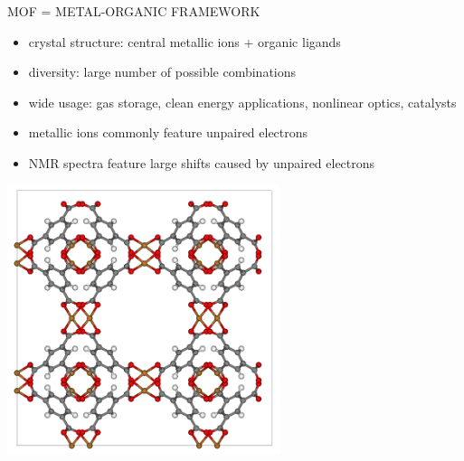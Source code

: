 \documentclass[slovene, usenames,dvipsnames]{beamer}
\begin{document}
\begin{frame}{MOF = METAL-ORGANIC FRAMEWORK }
  \begin{minipage}[]{0.5\textwidth}
    \begin{itemize}[]
       \item crystal structure: central metallic ions + organic ligands 
       \item diversity: large number of possible combinations  
       \item wide usage: gas storage, clean energy applications,
      nonlinear optics, catalysts
       \item metallic ions commonly feature unpaired electrons
       \item NMR spectra feature large shifts caused by unpaired electrons
    \end{itemize}
  \end{minipage}%
  \begin{minipage}[]{0.5\textwidth}
    \begin{minipage}[]{\textwidth}
      \centering
      \includegraphics[width=0.6\textwidth]{hkust.png}
    \end{minipage}
    
    \begin{minipage}[]{\textwidth}
      \centering
\end{minipage}
\end{minipage}
\end{frame}
\end{document}
